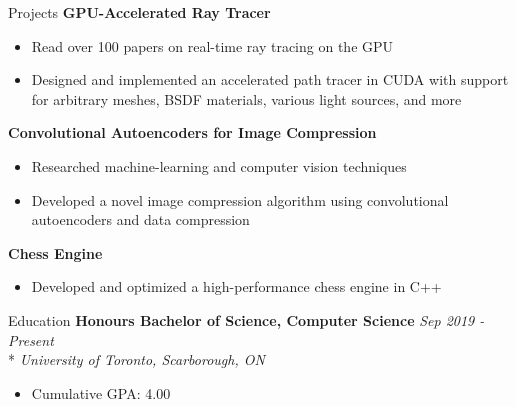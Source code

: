 \documentclass[11pt, letterpaper]{article}
\begin{document}
\begin{section}{Projects}
\textbf{GPU-Accelerated Ray Tracer}
\begin{itemize}
  \item Read over 100 papers on real-time ray tracing on the GPU
  \item Designed and implemented an accelerated path tracer in CUDA with support for arbitrary meshes, BSDF materials, various light sources, and more\\
\end{itemize}

\textbf{Convolutional Autoencoders for Image Compression}
\begin{itemize}
  \item Researched machine-learning and computer vision techniques
  \item Developed a novel image compression algorithm using convolutional autoencoders and data compression\\
\end{itemize}

\textbf{Chess Engine}
\begin{itemize}
  \item Developed and optimized a high-performance chess engine in C++
\end{itemize}

\end{section}

\begin{section}{Education}
\textbf{Honours Bachelor of Science, Computer Science}
\hfill
\textit{Sep 2019 - Present}\\*
\textit{University of Toronto, Scarborough, ON}
\begin{itemize}
  \item Cumulative GPA: 4.00
\end{itemize}

\end{section}
\end{document}
